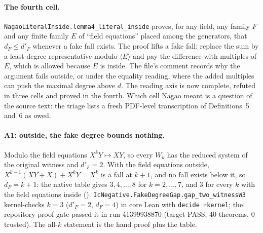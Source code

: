 \paragraph{The fourth cell.} \texttt{NagaoLiteralInside.lemma4\_literal\_inside}
proves, for any field, any family $F$ and any finite family $E$ of
``field equations'' placed among the generators, that $d_F\le d'_F$
whenever a fake fall exists. The proof lifts a fake fall: replace the sum by a
least-degree representative modulo $\langle E\rangle$ and pay the difference
with multiples of $E$, which is allowed because $E$ is inside. The file's
comment records why the argument fails outside, or under the equality
reading, where the added multiples can push the maximal degree above $d$. The
reading axis is now complete, refuted in three cells and proved in the
fourth. Which cell Nagao meant is a question of the source text: the triage
lists a fresh PDF-level transcription of Definitions~5 and~6 as owed.

\paragraph{A1: outside, the fake degree bounds nothing.} Modulo the field
equations $X^kY\mapsto XY$, so every $W_k$ has the reduced system of the
original witness and $d'_F=2$. With the field equations outside,
$X^{k-1}(XY+X)+X^kY=X^k$ is a fall at $k+1$, and no fall exists below it, so
$d_F=k+1$: the native table gives $3,4,\ldots,8$ for $k=2,\ldots,7$, and 3
for every $k$ with the field equations inside
().
\texttt{IcNegative.FakeDegreeGap.gap\_two\_witnessW3} kernel-checks $k=3$
($d'_F=2$, $d_F=4$) in core Lean with \texttt{decide +kernel}; the
repository proof gate passed it in run 41399938870 (target
 PASS, 40 theorems, 0 trusted). The
all-$k$ statement is the hand proof plus the table.

